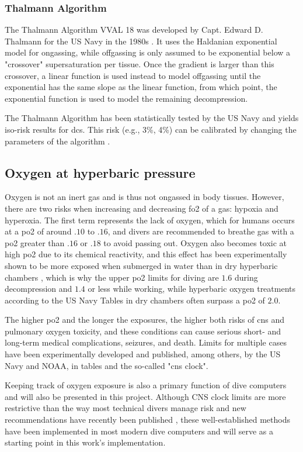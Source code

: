 \subsubsection{Thalmann Algorithm}
The Thalmann Algorithm VVAL 18 was developed by Capt. Edward D. Thalmann for the US Navy in the 1980s \cite{thalmann-tables-software-2010}. 
It uses the Haldanian exponential model for ongassing, while offgassing is only assumed to be exponential below a "crossover" supersaturation per tissue.
Once the gradient is larger than this crossover, a linear function is used instead to model offgassing until the exponential has the same slope as the linear function, from which point, the exponential function is used to model the remaining decompression.

The Thalmann Algorithm has been statistically tested by the US Navy and yields iso-risk results for \gls{dcs}.
This risk (e.g., 3\%, 4\%) can be calibrated by changing the parameters of the algorithm \cite{dial-dcs-risk-thalmann-2024}.


\subsection{Oxygen at hyperbaric pressure}
Oxygen is not an inert gas and is thus not ongassed in body tissues. 
However, there are two risks when increasing and decreasing \gls{fo2} of a gas: hypoxia and hyperoxia. 
The first term represents the lack of oxygen, which for humans occurs at a \gls{po2} of around $.10$ to $.16$, and divers are recommended to breathe gas with a \gls{po2} greater than $.16$ or $.18$ to avoid passing out. 
Oxygen also becomes toxic at high \gls{po2} due to its chemical reactivity, and this effect has been experimentally shown to be more exposed when submerged in water than in dry hyperbaric chambers \cite{chamber-divers-2024}, which is why the upper \gls{po2} limits for diving are $1.6$ during decompression and $1.4$ or less while working, while hyperbaric oxygen treatments according to the US Navy Tables in dry chambers often surpass a \gls{po2} of $2.0$.

The higher \gls{po2} and the longer the exposures, the higher both risks of \gls{cns} and pulmonary oxygen toxicity, and these conditions can cause serious short- and long-term medical complications, seizures, and death.
Limits for multiple cases have been experimentally developed and published, among others, by the US Navy and NOAA, in tables and the so-called "\gls{cns} clock".

Keeping track of oxygen exposure is also a primary function of dive computers and will also be presented in this project.
Although CNS clock limits are more restrictive than the way most technical divers manage risk and new recommendations have recently been published \cite{RevisedO2Tox2025}, these well-established methods have been implemented in most modern dive computers and will serve as a starting point in this work's implementation.

